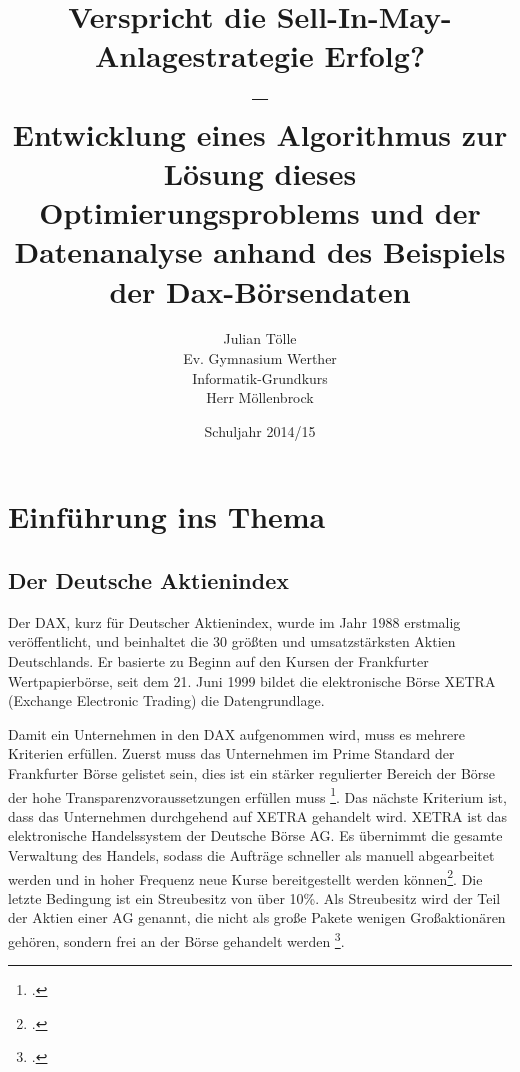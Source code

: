\documentclass[12pt, a4paper, titlepage]{report}
\begin{document}
    \begin{titlepage}
        \title{Verspricht die Sell-In-May-Anlagestrategie Erfolg?\\
                –\\
                Entwicklung eines Algorithmus zur Lösung dieses Optimierungsproblems
                und der Datenanalyse anhand des Beispiels der Dax-Börsendaten}
        \author{Julian Tölle\\
                Ev. Gymnasium Werther\\
                Informatik-Grundkurs\\
                Herr Möllenbrock}
        \date{Schuljahr 2014/15}

        \maketitle
    \end{titlepage}

    \tableofcontents
    \thispagestyle{empty}

    \setcounter{page}{2}

    \chapter{Einführung ins Thema}
        
        \section{Der Deutsche Aktienindex}
            Der DAX, kurz für Deutscher Aktienindex, wurde im Jahr 1988 erstmalig
            veröffentlicht, und beinhaltet die 30 größten und umsatzstärksten Aktien
            Deutschlands. Er basierte zu Beginn auf den Kursen der Frankfurter
            Wertpapierbörse, seit dem 21. Juni 1999 bildet die elektronische Börse
            XETRA (Exchange Electronic Trading) die Datengrundlage.
            
            Damit ein Unternehmen in den DAX aufgenommen wird, muss es mehrere Kriterien
            erfüllen. Zuerst muss das Unternehmen im Prime Standard der Frankfurter Börse
            gelistet sein, dies ist ein stärker regulierter Bereich der Börse der hohe
            Transparenzvoraussetzungen erfüllen muss
            \footcite[Vgl.][]{deutscheboersePrimeStandard}.
            Das nächste Kriterium ist, dass das Unternehmen durchgehend auf XETRA
            gehandelt wird. XETRA ist das elektronische Handelssystem der Deutsche
            Börse AG. Es übernimmt die gesamte Verwaltung des Handels, sodass die
            Aufträge schneller als manuell abgearbeitet werden und in hoher Frequenz
            neue Kurse bereitgestellt werden können\footcite[Vgl.][]{boerseFrankfurtXetra}.
            Die letzte Bedingung ist ein Streubesitz von über 10\%. Als Streubesitz
            wird der Teil der Aktien einer AG genannt, die nicht als große Pakete
            wenigen Großaktionären gehören, sondern frei an der Börse gehandelt werden
            \footcite[Vgl.][]{gablerFreefloat}.  
            
\end{document}
